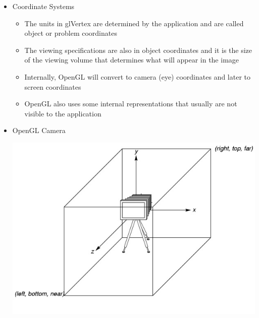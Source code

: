 \documentclass[11pt,a4paper]{article}
\begin{document}
\begin{itemize}
\begin{center}
			\end{center}
			\item Coordinate Systems
				\begin{itemize}
					\item The units in glVertex are determined by the application and are called object or problem coordinates	
					\item The viewing specifications are also in object	coordinates and it is the size of the viewing volume that determines what will appear in the image	
					\item Internally, OpenGL will convert to camera (eye) coordinates and later to screen coordinates 	
					\item OpenGL also uses some internal representations that usually are not visible to the application
				\end{itemize}
			\item OpenGL Camera 


			\begin{center}
				\includegraphics[scale=0.5]{pictures/OpenGLCamera.jpg}
			\end{center}


\end{itemize}
\end{document}
